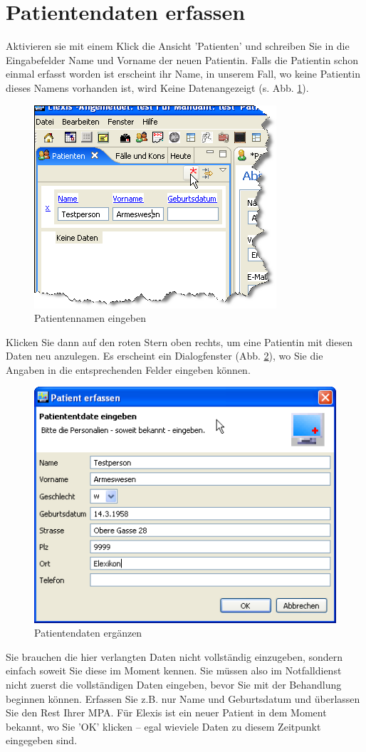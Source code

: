 \section{Patientendaten erfassen}
Aktivieren sie mit einem Klick die Ansicht 'Patienten' und schreiben Sie in die Eingabefelder Name und Vorname der neuen Patientin.
Falls die Patientin schon einmal erfasst worden ist erscheint ihr Name, in unserem Fall, wo keine Patientin dieses Namens vorhanden ist,
wird \glqq Keine Daten\grqq{}angezeigt (s. Abb. \ref{fig:patname}).
\begin{figure}[ht]
	\includegraphics{images/einf1}
	\caption{Patientennamen eingeben}
	\label{fig:patname}
\end{figure}
Klicken Sie dann auf den roten Stern oben rechts, um eine Patientin mit diesen
Daten neu anzulegen. Es erscheint ein Dialogfenster (Abb. \ref{fig:patdata}), wo
Sie die Angaben in die entsprechenden Felder eingeben können.
\begin{figure}[ht]
	\includegraphics{images/einf2}
	\caption{Patientendaten ergänzen}
	\label{fig:patdata}
\end{figure}
Sie brauchen die hier verlangten Daten nicht vollständig einzugeben, sondern einfach soweit Sie diese im Moment kennen.
Sie müssen also im Notfalldienst nicht zuerst die vollständigen Daten eingeben, bevor Sie mit der Behandlung beginnen können.
Erfassen Sie z.B. nur Name und Geburtsdatum und überlassen Sie den Rest Ihrer MPA. Für Elexis ist ein neuer Patient in dem Moment bekannt,
wo Sie 'OK' klicken -- egal wieviele Daten zu diesem Zeitpunkt eingegeben sind.

